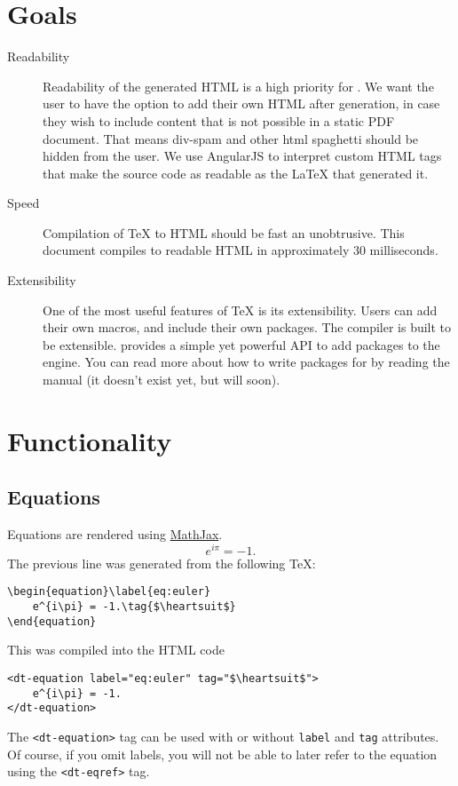 \documentclass[11pt]{article}
\begin{document}
\section{Goals}
\begin{description}
    \item[Readability] Readability of the generated HTML is a high priority for \DiscoTeX{}.
        We want the user to have the option to add their own HTML after generation, in case they wish to include content that is not possible in a static PDF document.
        That means div-spam and other html spaghetti should be hidden from the user.
        We use AngularJS to interpret custom HTML tags that make the source code as readable as the \LaTeX{} that generated it.

    \item[Speed] Compilation of \TeX{} to HTML should be fast an unobtrusive.
        This document compiles to readable HTML in approximately 30 milliseconds.

    \item[Extensibility] One of the most useful features of \TeX{} is its extensibility.
        Users can add their own macros, and include their own packages.
        The \DiscoTeX{} compiler is built to be extensible.
        \DiscoTeX{} provides a simple yet powerful API to add packages to the engine.
        You can read more about how to write packages for \DiscoTeX{} by reading the manual (it doesn't exist yet, but will soon).
\end{description}

\section{Functionality}
\subsection{Equations}
Equations are rendered using \href{https://www.mathjax.org}{MathJax}.
\begin{equation}\label{eq:euler}
    e^{i\pi} = -1.\tag{\heartsuit}
\end{equation}
The previous line was generated from the following \TeX:
\begin{verbatim}
\begin{equation}\label{eq:euler}
    e^{i\pi} = -1.\tag{$\heartsuit$}
\end{equation}
\end{verbatim}
This was compiled into the HTML code
\begin{verbatim}
<dt-equation label="eq:euler" tag="$\heartsuit$">
    e^{i\pi} = -1.
</dt-equation>
\end{verbatim}
The \verb|<dt-equation>| tag can be used with or without \verb|label| and \verb|tag| attributes.
Of course, if you omit labels, you will not be able to later refer to the equation using the \verb|<dt-eqref>| tag.
\end{document}
